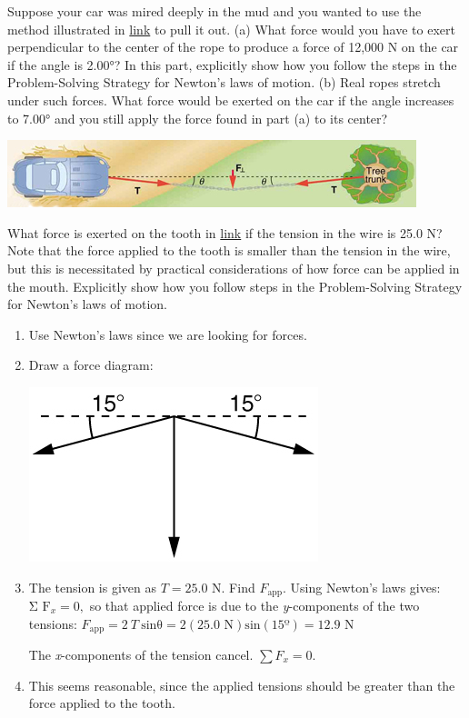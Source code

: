 \documentclass[
]{book}
\begin{document}
\hypertarget{fs-id1389092}{}
\leavevmode{}%
Suppose your car was mired deeply in the mud and you wanted to use the
method illustrated in
\protect\hyperlink{import-auto-id1436345}{link} to pull it out.
(a) What force would you have to exert perpendicular to the center of
the rope to produce a force of 12,000 N on the car if the angle is
2.00°? In this part, explicitly show how you follow the steps in the
Problem-Solving Strategy for Newton's laws of motion. (b) Real ropes
stretch under such forces. What force would be exerted on the car if the
angle increases to 7.00° and you still apply the force found in part (a)
to its center?

\includegraphics{images/Figure_04_06_09.jpg}

\hypertarget{fs-id2607890}{}
\leavevmode{}%
What force is exerted on the tooth in
\protect\hyperlink{import-auto-id1569692}{link} if the tension in
the wire is 25.0 N? Note that the force applied to the tooth is smaller
than the tension in the wire, but this is necessitated by practical
considerations of how force can be applied in the mouth. Explicitly show
how you follow steps in the Problem-Solving Strategy for Newton's laws
of motion.

\hypertarget{fs-id2324943}{}
\begin{enumerate}
\def\labelenumi{\arabic{enumi}.}
\item
  Use Newton's laws since we are looking for forces.
\item
  Draw a force diagram:

  \includegraphics{images/Figure_04_06_06.jpg}
\item
  The tension is given as \({T = \text{25.0\ N.}}{}\) Find
  \({F_{\text{app}}\text{.}}{}\) Using Newton's laws gives:
  \({\text{Σ\ F}_{x} = 0,}{}\) so that applied force is due to the
  \emph{y}-components of the two tensions:
  \({{F_{\text{app}} = 2\ }T\ \text{sin}{\text{θ} = 2}(\text{25.0\ N})\text{sin}\left( \text{15º} \right)}{} = \text{12.9\ N}\)

  The \emph{x}-components of the tension cancel. \({{\sum F_{x}} = 0}{}\).
\item
  This seems reasonable, since the applied tensions should be greater
  than the force applied to the tooth.
\end{enumerate}
\end{document}
